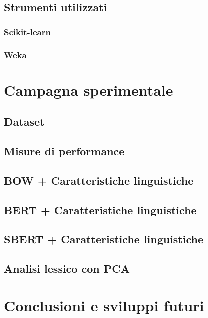 \documentclass[oneside]{book}
\begin{document}
\section{Strumenti utilizzati}

\subsection{Scikit-learn}
\subsection{Weka}




\chapter{Campagna sperimentale}
\section{Dataset}
\section{Misure di performance}
\section{BOW + Caratteristiche linguistiche}
\section{BERT + Caratteristiche linguistiche}
\section{SBERT + Caratteristiche linguistiche}
\section{Analisi lessico con PCA}





\chapter{Conclusioni e sviluppi futuri}
\end{document}
